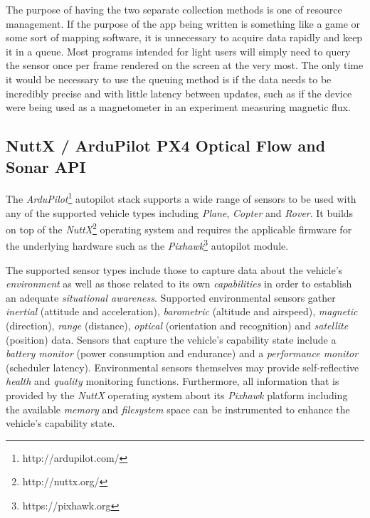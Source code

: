 \documentclass[paper=letter, fontsize=11pt]{scrartcl}
\numberwithin{equation}{section}
\numberwithin{figure}{section}
\numberwithin{table}{section}
\begin{document}
\par
The purpose of having the two separate collection methods is one of resource
management. If the purpose of the app being written is something like a game or
some sort of mapping software, it is unnecessary to acquire data rapidly and
keep it in a queue. Most programs intended for light users will simply need to
query the sensor once per frame rendered on the screen at the very most. The
only time it would be necessary to use the queuing method is if the data needs
to be incredibly precise and with little latency between updates, such as if
the device were being used as a magnetometer in an experiment measuring
magnetic flux.
\newline

\subsection{NuttX / ArduPilot PX4 Optical Flow and Sonar API}
\label{sec:ardupilot_flow_api}
\lstset{language=C++}
\par
The {\em ArduPilot}\footnote{http://ardupilot.com/} autopilot stack supports a
wide range of sensors to be used with any of the supported vehicle types
including {\em Plane}, {\em Copter} and {\em Rover}. It builds on top of the
{\em NuttX}\footnote{http://nuttx.org/} operating system and requires the
applicable firmware for the underlying hardware such as the
{\em Pixhawk}\footnote{https://pixhawk.org} autopilot module.
\newline

\par
The supported sensor types include those to capture data about the vehicle's
{\em environment} as well as those related to its own {\em capabilities} in
order to establish an adequate {\em situational awareness}.
Supported environmental sensors gather {\em inertial} (attitude and
acceleration), {\em barometric} (altitude and airspeed), {\em magnetic}
(direction), {\em range} (distance), {\em optical} (orientation and recognition)
and {\em satellite} (position) data. Sensors that capture the vehicle's
capability state include a {\em battery monitor} (power consumption and
endurance) and a {\em performance monitor} (scheduler latency). Environmental
sensors themselves may provide self-reflective {\em health} and {\em quality}
monitoring functions. Furthermore, all information that is provided by the {\em NuttX}
operating system about its {\em Pixhawk} platform including the available
{\em memory} and {\em filesystem} space can be instrumented to enhance the
vehicle's capability state.
\newline
\end{document}

